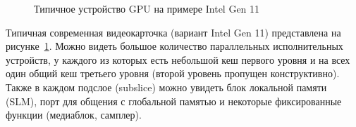 \begin{figure}[ht]
    \caption{Типичное устройство GPU на примере Intel Gen 11}\label{fig:typicalGPU}
\end{figure}

Типичная современная видеокарточка (вариант Intel Gen 11) представлена на рисунке~\cref{fig:typicalGPU}. Можно видеть большое количество параллельных исполнительных устройств, у каждого из которых есть небольшой кеш первого уровня и на всех один общий кеш третьего уровня (второй уровень пропущен конструктивно). Также в каждом подслое (subslice) можно увидеть блок локальной памяти (SLM), порт для общения с глобальной памятью и некоторые фиксированные функции (медиаблок, самплер).

